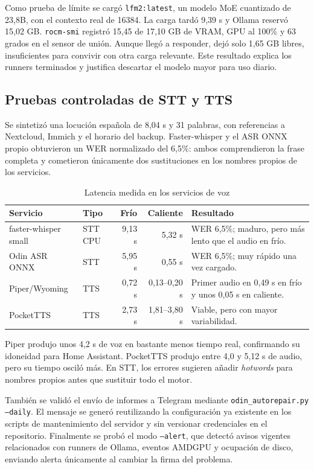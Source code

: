Como prueba de límite se cargó \texttt{lfm2:latest}, un modelo MoE cuantizado de 23,8B, con el contexto real de 16384. La carga tardó 9,39 s y Ollama reservó 15,02 GB. \texttt{rocm-smi} registró 15,45 de 17,10 GB de VRAM, GPU al 100\% y 63 grados en el sensor de unión. Aunque llegó a responder, dejó solo 1,65 GB libres, insuficientes para convivir con otra carga relevante. Este resultado explica los runners terminados y justifica descartar el modelo mayor para uso diario.

\subsection{Pruebas controladas de STT y TTS}
Se sintetizó una locución española de 8,04 s y 31 palabras, con referencias a Nextcloud, Immich y el horario del backup. Faster-whisper y el ASR ONNX propio obtuvieron un WER normalizado del 6,5\%: ambos comprendieron la frase completa y cometieron únicamente dos sustituciones en los nombres propios de los servicios.

\begin{table}[H]
  \centering
  \caption{Latencia medida en los servicios de voz}
  \label{tab:benchmark-voz}
  \begin{tabularx}{\textwidth}{l l r r X}
    \toprule
    Servicio & Tipo & Frío & Caliente & Resultado \\
    \midrule
    faster-whisper small & STT CPU & 9,13 s & 5,32 s & WER 6,5\%; maduro, pero más lento que el audio en frío. \\
    Odin ASR ONNX & STT & 5,95 s & 0,55 s & WER 6,5\%; muy rápido una vez cargado. \\
    Piper/Wyoming & TTS & 0,72 s & 0,13--0,20 s & Primer audio en 0,49 s en frío y unos 0,05 s en caliente. \\
    PocketTTS & TTS & 2,73 s & 1,81--3,80 s & Viable, pero con mayor variabilidad. \\
    \bottomrule
  \end{tabularx}
\end{table}

Piper produjo unos 4,2 s de voz en bastante menos tiempo real, confirmando su idoneidad para Home Assistant. PocketTTS produjo entre 4,0 y 5,12 s de audio, pero su tiempo osciló más. En STT, los errores sugieren añadir \textit{hotwords} para nombres propios antes que sustituir todo el motor.

También se validó el envío de informes a Telegram mediante \texttt{odin\_autorepair.py --daily}. El mensaje se generó reutilizando la configuración ya existente en los scripts de mantenimiento del servidor y sin versionar credenciales en el repositorio. Finalmente se probó el modo \texttt{--alert}, que detectó avisos vigentes relacionados con runners de Ollama, eventos AMDGPU y ocupación de disco, enviando alerta únicamente al cambiar la firma del problema.

